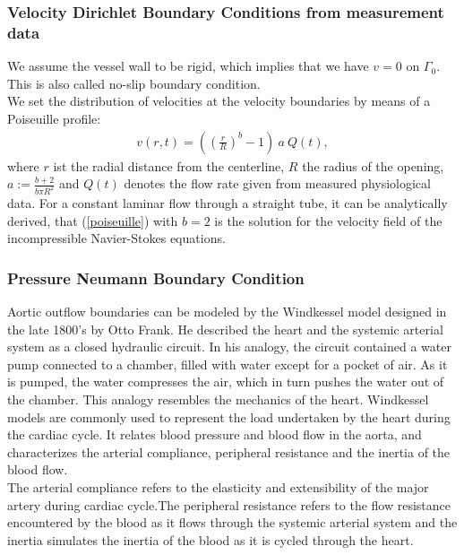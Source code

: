 \documentclass[a4paper, 11pt, twoside]{article}
\begin{document}
\subsubsection{Velocity Dirichlet Boundary Conditions from measurement data}
We assume the vessel wall to be rigid, which implies that we have $v=0$ on $\Gamma_0$. This is also called no-slip boundary condition.\\
We set the distribution of velocities at the velocity boundaries by means of a Poiseuille profile:
\begin{align}
 v(r,t) = \left(\left(\frac{r}{R}\right)^b-1\right)\ a\ Q(t),\label{poiseuille}
\end{align}
where $r$ ist the radial distance from the centerline, $R$ the radius of the opening, $a:= \frac{b+2}{b \pi R^2}$ and $Q(t)$ denotes the flow rate given from measured physiological data.
For a constant laminar flow through a straight tube, it can be analytically derived, that (\ref{poiseuille}) with $b=2$ is the solution for the velocity field of the incompressible Navier-Stokes equations.
\subsubsection{Pressure Neumann Boundary Condition}
Aortic outflow boundaries can be modeled by the Windkessel model designed
in the late 1800's by Otto Frank. He described the heart and the systemic arterial system as a closed hydraulic circuit. In his analogy,
the circuit contained a water pump connected to a chamber, filled with water except for a pocket
of air. As it is pumped, the water compresses the air, which in turn pushes the water out of the
chamber. This analogy resembles the mechanics of the heart. Windkessel models are commonly
used to represent the load undertaken by the heart during the cardiac cycle. It relates
blood pressure and blood flow in the aorta, and characterizes the arterial compliance, peripheral 
resistance and the inertia of the blood flow.\\
The arterial compliance refers to the elasticity 
and extensibility of the major artery during cardiac cycle.The peripheral resistance
refers to the flow resistance encountered by the blood as it flows
through the systemic arterial system and the inertia simulates the inertia of the blood as it is cycled through the heart.\\
\end{document}
